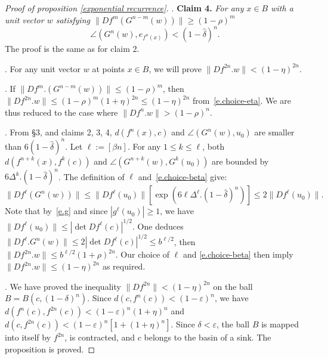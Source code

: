 \documentclass[a4paper,11pt]{article}
\theoremstyle{definition}
\begin{document}
\begin{proof}[Proof of proposition \ref{exponential recurrence}]
. {\bf Claim 4.} \emph{For any $x\in B$ with a unit vector $w$
satisfying $\|Df^m(G^{n-m}(w))\|\geq (1-\rho)^m$
$$\angle(G^n(w),e_{f^n(x)})<(1-\widehat \delta)^n .$$}
The proof is the same as for claim 2.
\bigskip

. For any unit vector $w$ at points $x\in B$, we will prove $\|Df^{2n}.w\|<(1-\eta)^{2n}$.
\bigskip

. If $\|Df^m.(G^{n-m}(w))\|\leq (1-\rho)^m$, then $\|Df^{2n}.w\|\leq (1-\rho)^m(1+\eta)^{2n}\leq (1-\eta)^{2n}$ from~\eqref{e.choice-eta}.
We are thus reduced to the case where $\|Df^n.w\|> (1-\rho)^n$.
\bigskip

. From \S3, and claims 2, 3, 4, $d(f^n(x),c)$ and $\angle(G^n(w),u_0)$
are smaller than $6(1-\widehat \delta)^n$.
Let $\ell:=[\beta n]$.
For any $1\leq k\leq \ell$, both $d(f^{n+k}(x),f^k(c))$ and
$\angle(G^{n+k}(w),G^k(u_0))$ are bounded by $6\Delta^k.(1-\widehat \delta)^n$.
The definition of $\ell$ and~\eqref{e.choice-beta} give:
$$\|Df^\ell(G^n(w))\|\leq \|Df^\ell(u_0)\|[\exp(6\ell\Delta^\ell.(1-\widehat \delta)^n)]\leq 
2\|Df^\ell(u_0)\|.$$
Note that by~\eqref{e.g} and since $|g^\ell(u_0)|\geq 1$,
we have $\|Df^\ell(u_0)\|\leq |\det Df^\ell(c)|^{1/2}$.
One deduces $\|Df^\ell.G^n(w)\|\leq 2 |\det Df^\ell(c)|^{1/2}\leq b^{\ell/2}$, then
$\|Df^{2n}.w\|\leq b^{\ell/2} (1+\rho)^{2n}$.
Our choice of $\ell$ and \eqref{e.choice-beta} then imply $\|Df^{2n}.w\|\leq (1-\eta)^{2n}$
as required.
\bigskip

. We have proved the inequality $\|Df^{2n}\|<(1-\eta)^{2n}$ on the ball $B=B(c,(1-\delta)^n)$.
Since $d(c,f^n(c))<(1-\varepsilon)^n$, we have $d(f^n(c),f^{2n}(c))<(1-\varepsilon)^n(1+\eta)^n$
and $d(c,f^{2n}(c))<(1-\varepsilon)^n[1+(1+\eta)^n]$. Since $\delta<\varepsilon$,
the ball $B$ is mapped into itself by $f^{2n}$, is contracted, and $c$ belongs to the basin of a sink.
The proposition is proved.

\end{proof}





 
\end{document}
